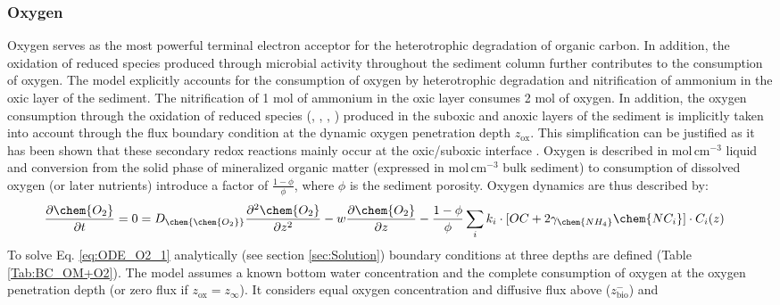 \documentclass[gmd, manuscript]{copernicus}
\begin{document}
\subsubsection{Oxygen}
Oxygen serves as the most powerful terminal electron acceptor for the heterotrophic degradation of organic carbon. In addition, the oxidation of reduced species produced through microbial activity throughout the 
sediment column further contributes to the consumption of oxygen. The model explicitly accounts for the consumption of oxygen by heterotrophic degradation and nitrification of ammonium in the oxic layer of the sediment. 
The nitrification of 1 mol of ammonium in the oxic layer consumes 2 mol of oxygen. 
In addition, the oxygen consumption through the oxidation of reduced species (, , , ) produced in the suboxic and anoxic layers of the sediment is implicitly taken into account 
through the flux boundary condition at the dynamic oxygen penetration depth $z_{\mathrm{ox}}$. This simplification can be justified as it has been shown that these secondary redox reactions mainly occur at the oxic/suboxic 
interface \citep{soetaert_model_1996}.  
Oxygen is described in mol\,cm$^{-3}$ liquid and conversion from the solid phase of mineralized organic matter (expressed in mol\,cm$^{-3}$ bulk sediment) to consumption of dissolved oxygen (or later nutrients) introduce 
a factor of $\frac{1-\phi}{\phi}$, where $\phi$ is the sediment porosity. Oxygen dynamics are thus described by:
\begin{align} 
 \frac{\partial \chem{O_2}}{\partial t} &= 0= D_{\chem{ \chem{O_2}}}\frac{\partial^2  \chem{O_2} }{\partial z^2} - w\frac{\partial  \chem{O_2}}{\partial z} - \frac{1-\phi}{\phi}\sum_i k_i \cdot [ OC + 2 \gamma_{\chem{NH_4}} \chem{NC_i} ]\cdot C_{i}(z) \label{eq:ODE_O2_1}
\end{align}
To solve Eq. \ref{eq:ODE_O2_1} analytically (see section \ref{sec:Solution}) boundary conditions at three depths are defined (Table \ref{Tab:BC_OM+O2}). 
The model assumes a known bottom water concentration and the complete consumption of oxygen at the oxygen penetration depth (or zero flux if $z_{\mathrm{ox}}=z_\infty$). 
It considers equal oxygen concentration and diffusive flux above ($z_{\mathrm{bio}}^-$) and 
\end{document}
